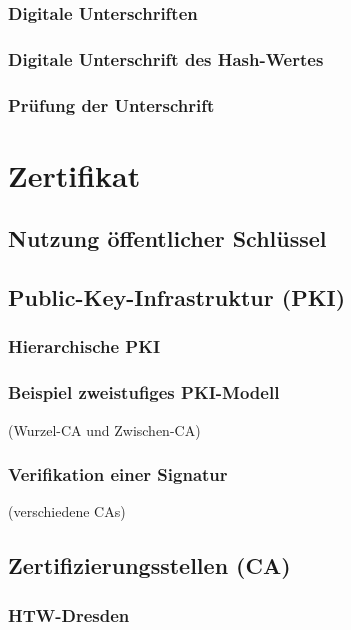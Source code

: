 \subsubsection{Digitale Unterschriften}
\subsubsection*{Digitale Unterschrift des Hash-Wertes}
\subsubsection*{Prüfung der Unterschrift}

\section{Zertifikat}
\subsection{Nutzung öffentlicher Schlüssel}

\subsection{Public-Key-Infrastruktur (PKI)}
\subsubsection{Hierarchische PKI}
\subsubsection{Beispiel zweistufiges PKI-Modell}
(Wurzel-CA und Zwischen-CA)
\subsubsection{Verifikation einer Signatur}
(verschiedene CAs)

\subsection{Zertifizierungsstellen (CA)}
\subsubsection{HTW-Dresden}
